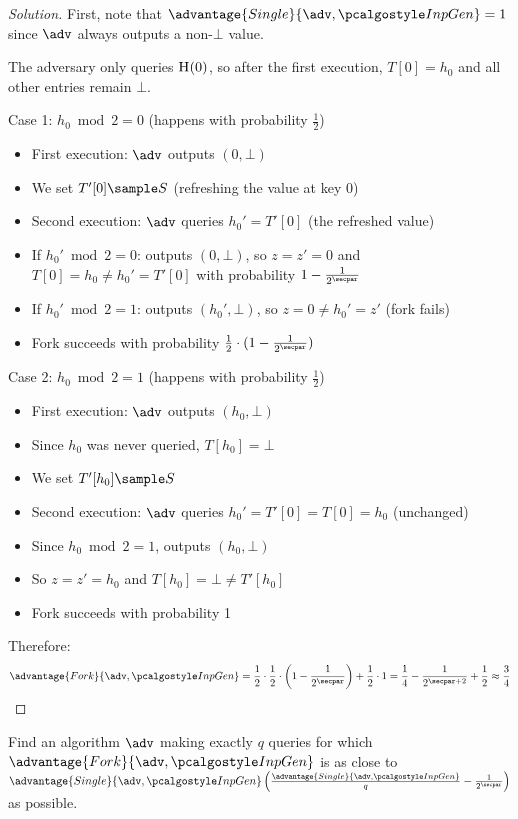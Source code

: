 \begin{proof}[Solution]
  First, note that $\advantage{Single}{\adv, \algo{InpGen}} = 1$ since $\adv$ always outputs a non-$\bot$ value. 
  
  The adversary only queries ${\normalfont\textsc{H}}(0)$, so after the first execution, $T[0] = h_0$ and all other entries remain $\bot$.
  
  Case 1: $h_0 \bmod 2 = 0$ (happens with probability $\frac{1}{2}$)
  \begin{itemize}
    \item First execution: $\adv$ outputs $(0, \bot)$
    \item We set $T'[0] \sample S$ (refreshing the value at key 0)
    \item Second execution: $\adv$ queries $h_0' = T'[0]$ (the refreshed value)
    \item If $h_0' \bmod 2 = 0$: outputs $(0, \bot)$, so $z = z' = 0$ and $T[0] = h_0 \neq h_0' = T'[0]$ with probability $1 - \frac{1}{2^\secpar}$
    \item If $h_0' \bmod 2 = 1$: outputs $(h_0', \bot)$, so $z = 0 \neq h_0' = z'$ (fork fails)
    \item Fork succeeds with probability $\frac{1}{2} \cdot (1 - \frac{1}{2^\secpar})$
  \end{itemize}
  
  Case 2: $h_0 \bmod 2 = 1$ (happens with probability $\frac{1}{2}$)
  \begin{itemize}
    \item First execution: $\adv$ outputs $(h_0, \bot)$
    \item Since $h_0$ was never queried, $T[h_0] = \bot$
    \item We set $T'[h_0] \sample S$
    \item Second execution: $\adv$ queries $h_0' = T'[0] = T[0] = h_0$ (unchanged)
    \item Since $h_0 \bmod 2 = 1$, outputs $(h_0, \bot)$
    \item So $z = z' = h_0$ and $T[h_0] = \bot \neq T'[h_0]$
    \item Fork succeeds with probability 1
  \end{itemize}
  
  Therefore:
  \[
  \advantage{Fork}{\adv, \algo{InpGen}} = \frac{1}{2} \cdot \frac{1}{2} \cdot \left(1 - \frac{1}{2^\secpar}\right) + \frac{1}{2} \cdot 1 = \frac{1}{4} - \frac{1}{2^{\secpar+2}} + \frac{1}{2} \approx \frac{3}{4}
  \]
\end{proof}

\begin{exercise}[Optional]
  Find an algorithm $\adv$ making exactly $q$ queries for which $\advantage{Fork}{\adv, \algo{InpGen}}$ is as close to $\advantage{Single}{\adv, \algo{InpGen}} \left( \frac{\advantage{Single}{\adv, \algo{InpGen}}}{q} - \frac{1}{2^\secpar} \right)$ as possible.
\end{exercise}

